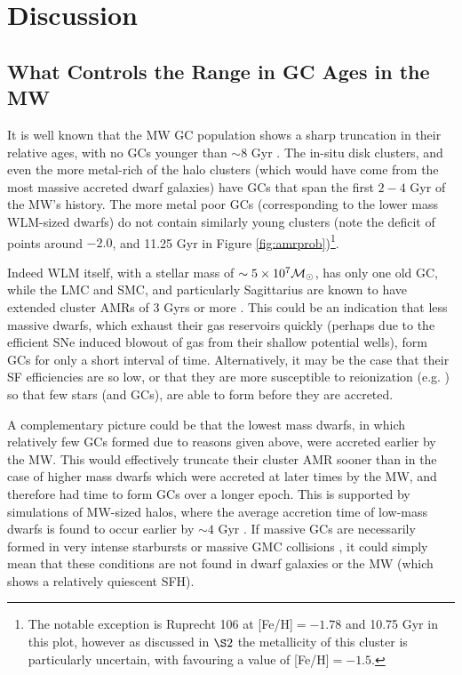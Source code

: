 \documentclass[useAMS,usenatbib]{mn2e}
\newcommand\msol{{{\cal M}_\odot}}
\begin{document}
\section{Discussion}
\subsection{What Controls the Range in GC Ages in the MW}
It is well known that the MW GC population shows a sharp truncation in their
relative ages, with no GCs younger than $\sim 8$ Gyr \citep{vdb00}.  The
in-situ disk clusters, and even the more metal-rich of the halo clusters (which
would have come from the most massive accreted dwarf galaxies) have GCs that
span the first $2-4$ Gyr of the MW's history.  The more metal poor GCs
(corresponding to the lower mass WLM-sized dwarfs) do not contain similarly
young clusters (note the deficit of points around $-2.0$, and 11.25 Gyr in Figure
\ref{fig:amrprob})\footnote{The notable exception is Ruprecht 106 at 
[Fe/H]$=-1.78$ and 10.75 Gyr in this plot, however as discussed in $\S 2$ 
the metallicity of this cluster is particularly uncertain, with \cite{Dotter11}
favouring a value of [Fe/H]$=-1.5$.}.

Indeed WLM itself, with a stellar mass of $\sim 5 \times 10^{7} \msol$, has only one
old GC, while the LMC and SMC, and particularly Sagittarius are known to have
extended cluster AMRs of 3 Gyrs or more \citep{Glatt08,Law10,Colucci11}.  This could be an
indication that less massive dwarfs, which exhaust their gas reservoirs quickly
(perhaps due to the efficient SNe induced blowout of gas from their shallow
potential wells), form GCs for only a short interval of time.  Alternatively,
it may be the case that their SF efficiencies are so low,
or that they are more susceptible to reionization (e.g. \citealt{Strader04})
so that few stars (and GCs), are able to form before they are accreted.  

A complementary picture could be that the lowest mass dwarfs, in which 
relatively few GCs formed due to reasons given above, were accreted earlier by
the MW.  This would effectively truncate their cluster AMR sooner than in the
case of higher mass dwarfs which were accreted at later times by the MW, and
therefore had time to form GCs over a longer epoch.  This is supported by
simulations of MW-sized halos, where the average accretion time of low-mass
dwarfs is found to occur earlier by $\sim 4$ Gyr \citep{BK10}.  
If massive GCs are necessarily formed 
in very intense starbursts \citep{Elmegreen12} or massive
GMC collisions \citep{Furukawa09}, it could simply mean that these conditions are not found
in dwarf galaxies or the MW (which shows a relatively quiescent SFH).
\end{document}
